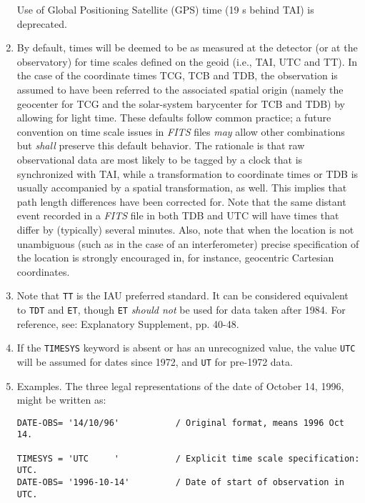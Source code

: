 \documentclass[11pt,makeidx]{book}     %
\begin{document}
\begin{enumerate}
  Use of Global Positioning Satellite (GPS) time (19 s behind TAI) is 
deprecated. 
 
\item By default, times will be deemed to be as measured at the detector (or
   at the observatory) for time scales defined on the geoid (i.e., TAI, UTC and
  TT).  In the case of the coordinate times TCG, TCB and TDB, the
  observation is assumed to have been referred to the associated spatial
  origin (namely the geocenter for TCG and the solar-system barycenter for
  TCB and TDB) by allowing for light time.  
   These
   defaults follow common practice; a future convention on time scale issues
   in {\em FITS\/} files {\em may} allow other combinations 
   but {\em shall} preserve this default
   behavior.  The rationale is that raw observational data are most likely
   to be tagged by a clock that is synchronized with TAI, while a
   transformation to coordinate times or TDB is usually accompanied by a
   spatial transformation, as well.  This implies that path length differences
   have been corrected for.  
   Note that the same distant event recorded in a {\em FITS\/} file in both TDB and UTC
   will have times that differ by (typically) several minutes.
   Also, note that when the location
   is not unambiguous (such as in the case of an interferometer) precise
   specification of the location is strongly encouraged in, for instance,
   geocentric Cartesian coordinates.
 
\item Note that {\tt TT} is the IAU preferred standard.  It can be considered
   equivalent to {\tt TDT} and {\tt ET}, though {\tt ET} {\em should not} be used 
   for data
   taken after 1984.  For reference, see: Explanatory Supplement, pp. 40-48.
 
\item If the {\tt TIMESYS} keyword is absent or has an unrecognized value,
   the value {\tt UTC} will be assumed for dates since 1972, 
   and {\tt UT} for pre-1972 data.
 
\item Examples.
   The three legal representations of the date of October 14, 1996, 
might be written as:
 
\begin{footnotesize}
\begin{verbatim}
DATE-OBS= '14/10/96'           / Original format, means 1996 Oct 14.
 
TIMESYS = 'UTC     '           / Explicit time scale specification: UTC.
DATE-OBS= '1996-10-14'         / Date of start of observation in UTC.
 

\end{verbatim}
\end{footnotesize}
\end{enumerate}
\end{document}
